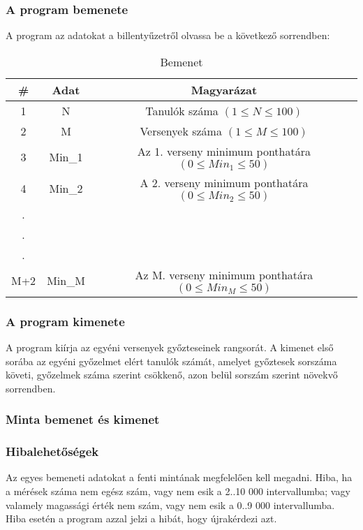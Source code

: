 \documentclass{article}
\begin{document}
      \subsubsection{A program bemenete}
        A program az adatokat a billentyűzetről olvassa be a következő sorrendben:
        \\
        \begin{table}[h!]
          \centering
          \caption{Bemenet}
          \label{tab:table1}
          \begin{tabular}{ccc}
            \toprule
            \# & Adat & Magyarázat \\
            \midrule
            1 & N & Tanulók száma $(1 \leqslant N \leqslant 100)$ \\
            2 & M & Versenyek száma $(1 \leqslant M \leqslant 100)$ \\
            3 & Min_1 & Az 1. verseny minimum ponthatára $(0 \leqslant Min_1 \leqslant 50)$ \\
            4 & Min_2 & A 2. verseny minimum ponthatára $(0 \leqslant Min_2 \leqslant 50)$ \\
            . \\
            . \\
            . \\
            M+2 & Min_M & Az M. verseny minimum ponthatára $(0 \leqslant Min_M \leqslant 50)$ \\
            \bottomrule
          \end{tabular}
        \end{table}
      \subsubsection{A program kimenete}
        A program kiírja az egyéni versenyek győzteseinek rangsorát.
        A kimenet első sorába az egyéni győzelmet elért tanulók számát,
        amelyet győztesek sorszáma követi, győzelmek száma szerint csökkenő,
        azon belül sorszám szerint növekvő sorrendben.
      \subsubsection{Minta bemenet és kimenet}
      \subsubsection{Hibalehetőségek}
        Az egyes bemeneti adatokat a fenti mintának megfelelően kell megadni.
        Hiba, ha a mérések száma nem egész szám, vagy nem esik a 2..10 000 intervallumba;
        vagy valamely magassági érték nem szám, vagy nem esik a 0..9 000 intervallumba.
        Hiba esetén a program azzal jelzi a hibát, hogy újrakérdezi azt.
\end{document}
